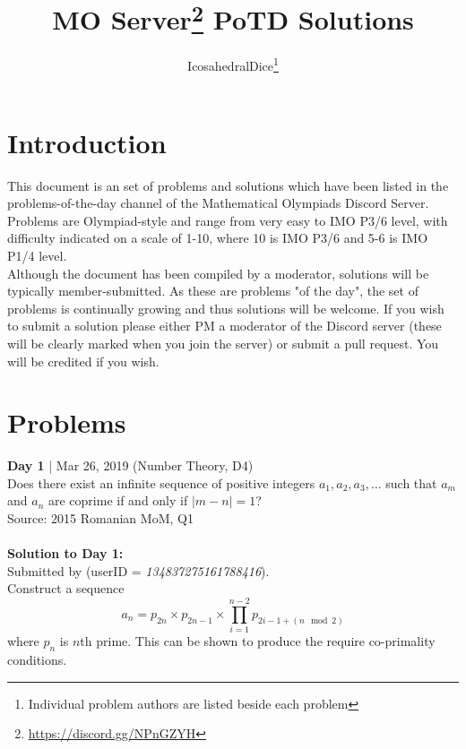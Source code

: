 \documentclass{article}
\title{MO Server\thanks{\url{https://discord.gg/NPnGZYH}} PoTD Solutions}
\author{IcosahedralDice\thanks{Individual problem authors are listed beside each problem}}
\newcommand{\problem}[6]{
\textbf{Day #1} | #2 (#5, D#6)\\
#4 \\
Source: #3\\
}
\newcommand{\solution}[4]{
\textbf{Solution to Day #1:}\\
Submitted by \textit{#2} (userID = \textit{#3}). \\
#4
}
\begin{document}
\maketitle
\section{Introduction}
This document is an set of problems and solutions which have been listed in the problems-of-the-day channel of the Mathematical Olympiads Discord Server. Problems are Olympiad-style and range from very easy to IMO P3/6 level, with difficulty indicated on a scale of 1-10, where 10 is IMO P3/6 and 5-6 is IMO P1/4 level. \\
Although the document has been compiled by a moderator, solutions will be typically member-submitted. As these are problems "of the day", the set of problems is continually growing and thus solutions will be welcome. If you wish to submit a solution please either PM a moderator of the Discord server (these will be clearly marked when you join the server) or submit a pull request. You will be credited if you wish. 

\section{Problems}
\problem{1}{Mar 26, 2019}{2015 Romanian MoM, Q1}{Does there exist an infinite sequence of positive integers $a_1, a_2, a_3, \dots$ such that $a_m$ and $a_n$ are coprime if and only if $\vert m - n \vert = 1$?}{Number Theory}{4}\\
\solution{1}{}{134837275161788416}{Construct a sequence $$a_n = p_{2n}\times p_{2n-1}\times \prod_{i=1}^{n-2} {p_{2i-1+(n \mod 2)}}$$ where $p_n$ is $n$th prime. This can be shown to produce the require co-primality conditions.}
\end{document}
